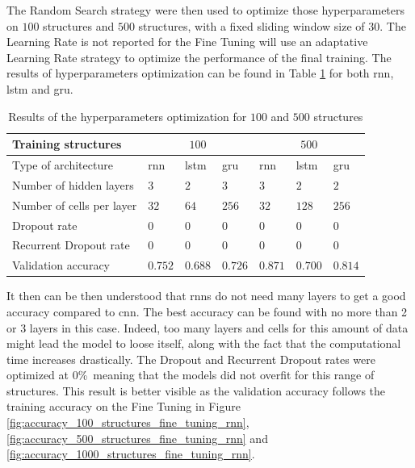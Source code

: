 \documentclass[conference]{IEEEtran}
\begin{document}
The Random Search strategy were then used to optimize those hyperparameters on $ 100 $ structures and $ 500 $ structures, with a fixed sliding window size of $30$. The Learning Rate is not reported for the Fine Tuning will use an adaptative Learning Rate strategy to optimize the performance of the final training. The results of hyperparameters optimization can be found in Table \ref{tab:results_parameters_rnn_optimization} for both \gls{rnn}, \gls{lstm} and \gls{gru}.



\begin{table}[htp]
	\centering
	\caption{Results of the hyperparameters optimization for $ 100 $ and $ 500 $ structures}
	\label{tab:results_parameters_rnn_optimization}
	\begin{tabular}{p{2.5cm}|lll|lll}
		Training structures & \multicolumn{3}{c}{$ 100 $} & \multicolumn{3}{c}{$ 500 $} \\
		\hline
		Type of architecture & \gls{rnn} & \gls{lstm} & \gls{gru} & \gls{rnn} & \gls{lstm} & \gls{gru}\\
		\hline
		Number of hidden layers & $3$ & $2$ & $3$ & $3$ & $2$ & $2$ \\
		Number of cells per layer & $32$ & $64$ & $256$ & $32$ & $128$ & $256$ \\
		Dropout rate & $0$ & $0$ & $0$ & $0$ & $0$ & $0$ \\
		Recurrent Dropout rate & $0$ & $0$ & $0$& $0$ & $0$ & $0$ \\
		\hline
		Validation accuracy & $0.752$ & $0.688$ & $0.726$ & $0.871$ & $0.700$ & $0.814$
	\end{tabular}
\end{table}


It then can be then understood that \glspl{rnn} do not need many layers to get a good accuracy compared to \gls{cnn}. The best accuracy can be found with no more than 2 or 3 layers in this case. Indeed, too many layers and cells for this amount of data might lead the model to loose itself, along with the fact that the computational time increases drastically. The Dropout and Recurrent Dropout rates were optimized at 0\%\ meaning that the models did not overfit for this range of structures. This result is better visible as the validation accuracy follows the training accuracy on the Fine Tuning in Figure \ref{fig:accuracy_100_structures_fine_tuning_rnn}, \ref{fig:accuracy_500_structures_fine_tuning_rnn} and \ref{fig:accuracy_1000_structures_fine_tuning_rnn}.
\end{document}
